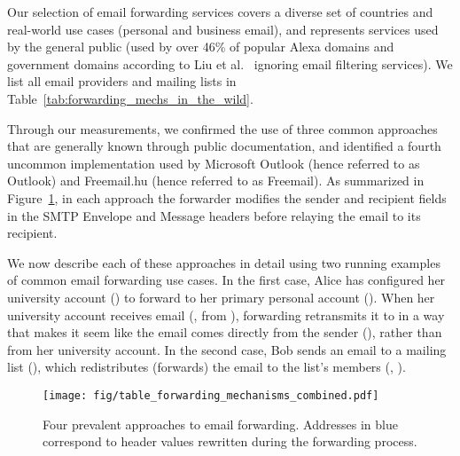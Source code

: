 Our selection of email forwarding services covers a diverse set of countries and real-world use cases (personal and business email), and represents services used by the general public (used by over 46\% of popular Alexa domains and government domains according to Liu et al.~\cite{liu2021s} ignoring email filtering services).
We list all email providers and mailing lists in Table~\ref{tab:forwarding_mechs_in_the_wild}.


Through our measurements, we confirmed the use of three common
approaches that are generally known through public documentation, and
identified a fourth uncommon implementation used by
Microsoft Outlook (hence referred to as Outlook) and Freemail.hu (hence referred to as Freemail).
As summarized in
Figure~\ref{fig:forwarding_mechs_combined}, in each approach the
forwarder modifies the sender and recipient fields in the SMTP
Envelope and Message headers before relaying the email to its
recipient.




We now describe each of these approaches in detail using two running
examples of common email forwarding use cases.  In the first case,
Alice has configured her university account () to
forward to her primary personal account ().  When
her university account receives email (\eg, from
), forwarding retransmits it to
 in a way that makes it seem like the email comes
directly from the sender (), rather than from her
university account.  In the second case, Bob sends an email to a
mailing list (), which redistributes (forwards) the
email to the list's members (\eg, ).


\begin{figure}[t]
  \centering
    \texttt{[image: fig/table\_forwarding\_mechanisms\_combined.pdf]}
    \caption[Four Prevalent Approaches to Email Forwarding]{Four prevalent approaches to email forwarding.  Addresses
      in blue correspond to header values rewritten during the
      forwarding process.
      }
    \label{fig:forwarding_mechs_combined}
\end{figure}


